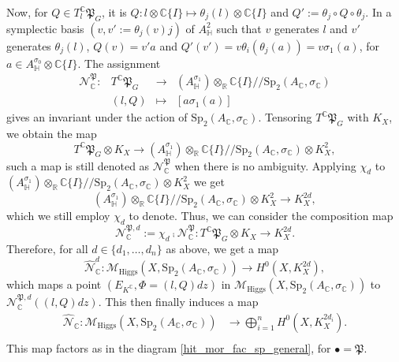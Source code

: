 \documentclass[oneside,11pt]{amsart}
\theoremstyle{definition}
\theoremstyle{remark}
\numberwithin{thm}{section}
\numberwithin{equation}{section}
\begin{document}
Now, for $Q\in T_l^\mathbb C\mathfrak{P}_G$, it is $Q \colon  l\otimes \mathbb C\{I\} \mapsto \theta_j(l)\otimes \mathbb C\{I\}$ and $Q':=\theta_j\circ Q\circ\theta_j$. In a symplectic basis $(v,v':=\theta_j(v)j)$ of $A_\mathbb H^2$ such that $v$ generates $l$ and $v'$ generates $\theta_j(l)$, $Q(v)=v'a$ and $Q'(v')=v\theta_i(\theta_j(a))=v\sigma_1(a)$, for $a\in A_\mathbb H^{\sigma_0}\otimes\mathbb C\{I\}$. The assignment
$$\begin{array}{rccl}
\mathcal N_\mathbb C^{\mathfrak P}\colon &T^{\mathbb{C}}\mathfrak{P}_G & \to & (A_\mathbb H^{\sigma_1})\otimes_\mathbb R\mathbb C\{I\}/\!\!/\mathrm{Sp}_2(A_\mathbb C,\sigma_\mathbb C)\\
& (l,Q) &\mapsto & [a\sigma_1(a)]
\end{array}$$
gives an invariant under the action of $\mathrm{Sp}_2(A_\mathbb C,\sigma_\mathbb C)$. Tensoring $T^{\mathbb{C}}\mathfrak{P}_G$ with $K_X$, we obtain the map
$$
T^{\mathbb{C}}\mathfrak{P}_G\otimes K_X  \to  (A_\mathbb H^{\sigma_1})\otimes_\mathbb R\mathbb C\{I\}/\!\!/\mathrm{Sp}_2(A_\mathbb C,\sigma_\mathbb C)\otimes K_X^2,
$$
such  a map is still denoted as $\mathcal N_\mathbb C^{\mathfrak P}$ when there is no ambiguity. Applying $\chi_d$ to $(A_\mathbb H^{\sigma_1})\otimes_\mathbb R\mathbb C\{I\}/\!\!/\mathrm{Sp}_2(A_\mathbb C,\sigma_\mathbb C)\otimes K_X^2$ we get
$$
(A_\mathbb H^{\sigma_1})\otimes_\mathbb R\mathbb C\{I\}/\!\!/\mathrm{Sp}_2(A_\mathbb C,\sigma_\mathbb C)\otimes K_X^2 \longrightarrow K_X^{2d},
$$
which we still employ $\chi_d$ to denote. Thus, we can consider the composition map
$$
\mathcal N_\mathbb C^{\mathfrak P,d}:=\chi_d\comp\mathcal N_\mathbb C^{\mathfrak P}: T^{\mathbb{C}}\mathfrak{P}_G\otimes K_X  \longrightarrow  K_X^{2d}.
$$
Therefore, for all $d\in\{d_1,\dots,d_n\}$ as above, we get a map
\[
\hat{\mathcal N}^d_\mathbb C\colon \mathcal{M}_{\mathrm{Higgs}}(X,\mathrm{Sp}_2(A_{\mathbb{C}}, \sigma_{\mathbb{C}})) \to H^0(X, K^{2d}_X),\]
which maps a point $(E_{K^{\mathbb{C}}}, \Phi=(l,Q)dz)$ in $\mathcal{M}_{\mathrm{Higgs}}(X,\mathrm{Sp}_2(A_\mathbb{C},\sigma_\mathbb C))$ to $\mathcal N_\mathbb C^{\mathfrak P,d}((l,Q)dz)$. 
This then finally induces a map
\begin{align*}
 \hat{\mathcal{N}}_{\mathbb{C}}\colon  \mathcal{M}_{\mathrm{Higgs}}(X,\mathrm{Sp}_2(A_{\mathbb{C}}, \sigma_{\mathbb{C}})) & \to \bigoplus_{i=1}^{n} H^0(X, K_X^{2d_i}). \\
 \end{align*}
This map factors as in the diagram \eqref{hit_mor_fac_sp_general}, for $\bullet = \mathfrak{P}.$
\end{document}
